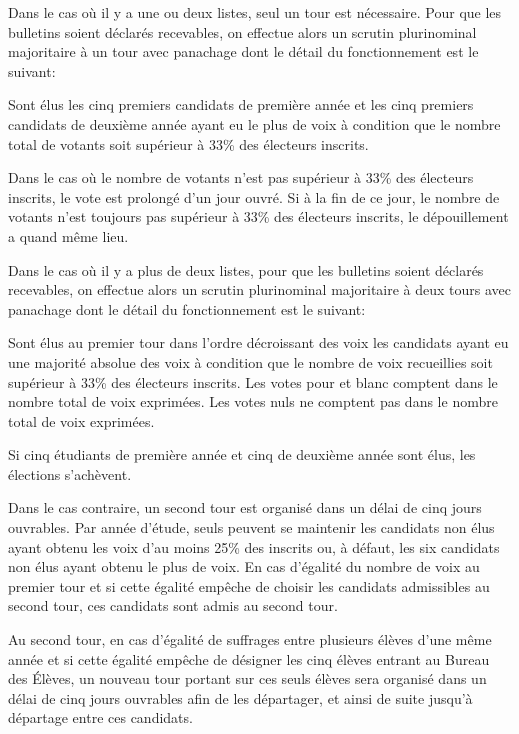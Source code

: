 \documentclass{article}
\begin{document}
				Dans le cas où il y a une ou deux listes, seul un tour est
				nécessaire. Pour que les bulletins soient déclarés recevables,
				on effectue alors un scrutin plurinominal majoritaire à un tour
				avec panachage dont le détail du fonctionnement est le suivant:

				\begin{adjustwidth}{1cm}{}
					Sont élus les cinq premiers candidats de première année et
					les cinq premiers candidats de deuxième année ayant eu le
					plus de voix à condition que le nombre total de votants soit
					supérieur à 33\% des électeurs inscrits.

					Dans le cas où le nombre de votants n’est pas supérieur à
					33\% des électeurs inscrits, le vote est prolongé d’un jour
					ouvré. Si à la fin de ce jour, le nombre de votants n’est
					toujours pas supérieur à 33\% des électeurs inscrits, le
					dépouillement a quand même lieu.
				\end{adjustwidth}

				Dans le cas où il y a plus de deux listes, pour que les
				bulletins soient déclarés recevables, on effectue alors un
				scrutin plurinominal majoritaire à deux tours avec panachage
				dont le détail du fonctionnement est le suivant:

				\begin{adjustwidth}{1cm}{}
				Sont élus au premier tour dans l’ordre décroissant des voix les
					candidats ayant eu une majorité absolue des voix à condition
					que le nombre de voix recueillies soit supérieur à 33\% des
					électeurs inscrits. Les votes pour et blanc comptent dans le
					nombre total de voix exprimées. Les votes nuls ne comptent
					pas dans le nombre total de voix exprimées.

					Si cinq étudiants de première année et cinq de deuxième
					année sont élus, les élections s’achèvent.
				
					Dans le cas contraire, un second tour est organisé dans un
					délai de cinq jours ouvrables. Par année d’étude, seuls
					peuvent se maintenir les candidats non élus ayant obtenu les
					voix d’au moins 25\% des inscrits ou, à défaut, les six
					candidats non élus ayant obtenu le plus de voix. En cas
					d’égalité du nombre de voix au premier tour et si cette
					égalité empêche de choisir les candidats admissibles au
					second tour, ces candidats sont admis au second tour.

					Au second tour, en cas d'égalité de suffrages entre
					plusieurs élèves d'une même année et si cette égalité
					empêche de désigner les cinq élèves entrant au Bureau des
					Élèves, un nouveau tour portant sur ces seuls élèves sera
					organisé dans un délai de cinq jours ouvrables afin de les
					départager, et ainsi de suite jusqu’à départage entre ces
					candidats.
				\end{adjustwidth}
\end{document}
